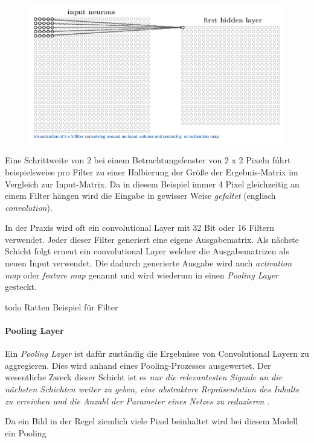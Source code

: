 \begin{figure}[!htb]
	\centering
	\includegraphics[width=.6\linewidth]{img/cnn_convLayer}
	\label{fig:cnn_convLayer}
\end{figure}

Eine Schrittweite von 2 bei einem Betrachtungsfenster von 2 x 2 Pixeln fúhrt beispielsweise pro Filter zu einer Halbierung der Größe der Ergebnis-Matrix im Vergleich zur Input-Matrix. Da in diesem Beispiel immer 4 Pixel gleichzeitig an einem Filter hängen wird die Eingabe in gewisser Weise \emph{gefaltet} (englisch \emph{convolution}). 

In der Praxis wird oft ein convolutional Layer mit 32 Bit oder 16 Filtern verwendet. Jeder dieser Filter generiert eine eigene Ausgabematrix. Als nächste Schicht folgt erneut ein convolutional Layer welcher die Ausgabematrizen als neuen Input verwendet. Die dadurch generierte Ausgabe wird auch \emph{activation map} oder \emph{feature map} genannt und wird wiederum in einen \emph{Pooling Layer} gesteckt. 

todo Ratten Beispiel für Filter 

\paragraph{Pooling Layer}
Ein \emph{Pooling Layer} ist dafür zuständig die Ergebnisse von Convolutional Layern zu aggregieren. Dies wird anhand eines Pooling-Prozesses ausgewertet. Der wesentliche Zweck dieser Schicht ist es \emph{nur die relevantesten Signale an die nächsten Schichten weiter zu geben, eine abstraktere Repräsentation des Inhalts zu erreichen und die Anzahl der Parameter eines Netzes zu reduzieren} \cite{cnnFunktionsweise2}. 

Da ein Bild in der Regel ziemlich viele Pixel beinhaltet wird bei diesem Modell ein Pooling 



